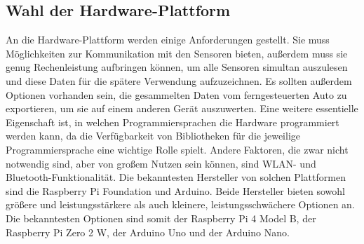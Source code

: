 \subsection{Wahl der Hardware-Plattform}
\label{subsec:elekMikrocontroller}
An die Hardware-Plattform werden einige Anforderungen gestellt. Sie muss Möglichkeiten zur Kommunikation mit den Sensoren bieten, außerdem muss sie genug Rechenleistung aufbringen können, um alle Sensoren simultan auszulesen und diese Daten für die spätere Verwendung aufzuzeichnen. Es sollten außerdem Optionen vorhanden sein, die gesammelten Daten vom ferngesteuerten Auto zu exportieren, um sie auf einem anderen Gerät auszuwerten. Eine weitere essentielle Eigenschaft ist, in welchen Programmiersprachen die Hardware programmiert werden kann, da die Verfügbarkeit von Bibliotheken für die jeweilige Programmiersprache eine wichtige Rolle spielt. Andere Faktoren, die zwar nicht notwendig sind, aber von großem Nutzen sein können, sind \ac{WLAN}- und Bluetooth-Funktionalität. Die bekanntesten Hersteller von solchen Plattformen sind die Raspberry Pi Foundation und Arduino.  Beide Hersteller bieten sowohl größere und leistungsstärkere als auch kleinere, leistungsschwächere Optionen an. Die bekanntesten Optionen sind somit der Raspberry Pi 4 Model B, der Raspberry Pi Zero 2 W, der Arduino Uno und der Arduino Nano. 
